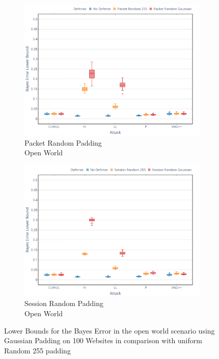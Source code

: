\documentclass[
	ruledheaders=chapter,
	class=report,
	thesis={type=master, department=inf},
	accentcolor=1c,
	custommargins=true,
	marginpar=false,
	parskip=half-,
	fontsize=11pt,
]{tudapub}
\begin{document}
	\begin{figure}
		\begin{subfigure}{0.495\textwidth}
			\centering
			\includegraphics[width=\textwidth]{plots/bounds_ow_pkt.png}
			\caption{Packet Random Padding\\Open World}
		\end{subfigure}
		\hfill
		\begin{subfigure}{0.495\textwidth}
			\centering
			\includegraphics[width=\textwidth]{plots/bounds_ow_ses.png}
			\caption{Session Random Padding\\Open World}
		\end{subfigure}
		\caption[Lower Bounds for the Bayes Error in the open world scenario]{Lower Bounds for the Bayes Error in the open world scenario using Gaussian Padding on 100 Websites in comparison with uniform Random 255 padding}
		\label{fig:bound_ow}
	\end{figure}
\end{document}
